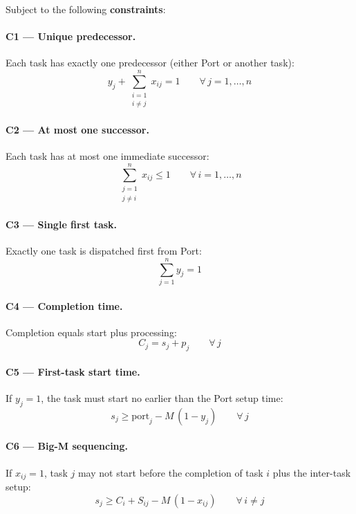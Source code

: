 \documentclass[11pt,a4paper]{article}
\begin{document}
Subject to the following \textbf{constraints}:

\paragraph{C1 — Unique predecessor.} Each task has exactly one predecessor
(either Port or another task):
\begin{equation}
    y_j + \sum_{\substack{i=1\\i \neq j}}^{n} x_{ij} = 1
    \qquad \forall\, j = 1,\ldots,n
    \tag{C1}
\end{equation}

\paragraph{C2 — At most one successor.} Each task has at most one immediate
successor:
\begin{equation}
    \sum_{\substack{j=1\\j \neq i}}^{n} x_{ij} \leq 1
    \qquad \forall\, i = 1,\ldots,n
    \tag{C2}
\end{equation}

\paragraph{C3 — Single first task.} Exactly one task is dispatched first
from Port:
\begin{equation}
    \sum_{j=1}^{n} y_j = 1
    \tag{C3}
\end{equation}

\paragraph{C4 — Completion time.} Completion equals start plus processing:
\begin{equation}
    C_j = s_j + p_j
    \qquad \forall\, j
    \tag{C4}
\end{equation}

\paragraph{C5 — First-task start time.} If $y_j = 1$, the task must start
no earlier than the Port setup time:
\begin{equation}
    s_j \geq \text{port}_j - M\,(1 - y_j)
    \qquad \forall\, j
    \tag{C5}
\end{equation}

\paragraph{C6 — Big-M sequencing.} If $x_{ij} = 1$, task $j$ may not start
before the completion of task $i$ plus the inter-task setup:
\begin{equation}
    s_j \geq C_i + S_{ij} - M\,(1 - x_{ij})
    \qquad \forall\, i \neq j
    \tag{C6}
\end{equation}
\end{document}
